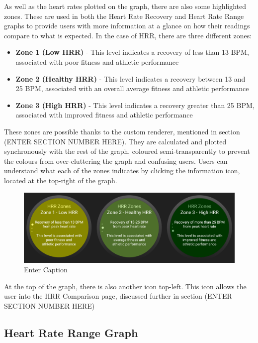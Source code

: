 \documentclass{l4proj}
\begin{document}
As well as the heart rates plotted on the graph, there are also some highlighted zones. These are used in both the Heart Rate Recovery and Heart Rate Range graphs to provide users with more information at a glance on how their readings compare to what is expected. In the case of HRR, there are three different zones:

\begin{itemize}
    \item \textbf{Zone 1 (Low HRR)} - This level indicates a recovery of less than 13 BPM, associated with poor fitness and athletic performance
    \item \textbf{Zone 2 (Healthy HRR)} - This level indicates a recovery between 13 and 25 BPM, associated with an overall average fitness and athletic performance
    \item \textbf{Zone 3 (High HRR)} - This level indicates a recovery greater than 25 BPM, associated with improved fitness and athletic performance
\end{itemize}

These zones are possible thanks to the custom renderer, mentioned in section (ENTER SECTION NUMBER HERE). They are calculated and plotted synchronously with the rest of the graph, coloured semi-transparently to prevent the colours from over-cluttering the graph and confusing users. Users can understand what each of the zones indicates by clicking the information icon, located at the top-right of the graph.

\begin{figure}[h]
    \centering
    \includegraphics[width=1\linewidth]{dissertation//dissImages/CopmbinedHRRZones.png}
    \caption{Enter Caption}
    \label{fig:enter-label}
\end{figure}

At the top of the graph, there is also another icon top-left. This icon allows the user into the HRR Comparison page, discussed further in section (ENTER SECTION NUMBER HERE)

\subsection{Heart Rate Range Graph}
\end{document}
